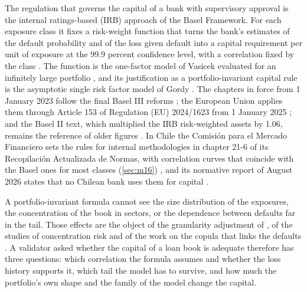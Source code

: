 The regulation that governs the capital of a bank with supervisory approval is the internal ratings-based (IRB) approach of the Basel
Framework. For each exposure class it fixes a risk-weight function that turns the bank's estimates of the default probability and of
the loss given default into a capital requirement per unit of exposure at the 99.9 percent confidence level, with a correlation fixed
by the class \citep{credit-capital:basel-cre31,credit-capital:basel-cre32}. The function is the one-factor model of Vasicek
evaluated for an infinitely large portfolio \citep{ratings:bcbs2005}, and its justification as a portfolio-invariant capital
rule is the asymptotic single risk factor model of Gordy \citep{ratings:gordy2003}. The chapters in force from 1 January 2023
follow the final Basel III reforms \citep{credit-capital:basel-d424}; the European Union applies them through Article 153 of Regulation
(EU) 2024/1623 from 1 January 2025 \citep{credit-capital:crr3}; and the Basel II text, which multiplied the IRB risk-weighted assets by
1.06, remains the reference of older figures \citep{credit-capital:basel-cre30}. In Chile the Comisi\'on para el Mercado Financiero sets
the rules for internal methodologies in chapter 21-6 of its Recopilaci\'on Actualizada de Normas, with correlation curves that coincide with
the Basel ones for most classes (\cref{sec:m16}) \citep{credit-capital:cmf-ran21-6}, and its normative report of August 2026 states that no Chilean bank uses them for capital
\citep{credit-capital:cmf-informe2026}.

A portfolio-invariant formula cannot see the size distribution of the exposures, the concentration of the book in sectors, or the
dependence between defaults far in the tail. Those effects are the object of the granularity adjustment of
\citet{credit-capital:gordylutkebohmert2013}, of the studies of concentration risk
\citep{credit-capital:bcbs-wp15,credit-capital:dullmannmasschelein2007} and of the work on the copula that links the defaults
\citep{credit-capital:li2000,credit-capital:freymcneil2003}. A validator asked whether the capital of a loan book is adequate therefore
has three questions: which correlation the formula assumes and whether the loss history supports it, which tail the model has to
survive, and how much the portfolio's own shape and the family of the model change the capital.

